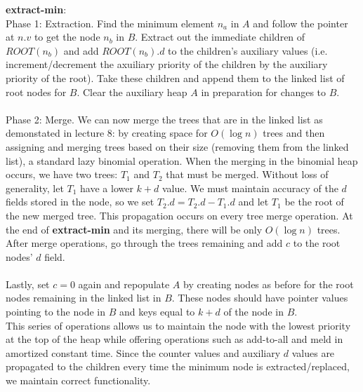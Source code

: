\documentclass{article}
\theoremstyle{casestyle}
\begin{document}
\textbf{extract-min}: \\ Phase 1: Extraction. Find the minimum element $n_a$ in $A$ and follow the pointer at $n.v$ to get the node $n_b$ in $B$. Extract out the immediate children of $ROOT(n_b)$ and add $ROOT(n_b).d$ to the children's auxiliary values (i.e. increment/decrement the axuiliary priority of the children by the auxiliary priority of the root). Take these children and append them to the linked list of root nodes for $B$. Clear the auxiliary heap $A$ in preparation for changes to $B$. \\\\ Phase 2: Merge. We can now merge the trees that are in the linked list as demonstated in lecture 8: by creating space for $O(\log n)$ trees and then assigning and merging trees based on their size (removing them from the linked list), a standard lazy binomial operation. When the merging in the binomial heap occurs, we have two trees: $T_1$ and $T_2$ that must be merged. Without loss of generality, let $T_1$ have a lower $k+d$ value. We must maintain accuracy of the $d$ fields stored in the node, so we set $T_2.d = T_2.d - T_1.d$ and let $T_1$ be the root of the new merged tree. This propagation occurs on every tree merge operation. At the end of \textbf{extract-min} and its merging, there will be only $O(\log n)$ trees. After merge operations, go through the trees remaining and add $c$ to the root nodes' $d$ field. \\\\ Lastly, set $c=0$ again and repopulate $A$ by creating nodes as before for the root nodes remaining in the linked list in $B$. These nodes should have pointer values pointing to the node in $B$ and keys equal to $k+d$ of the node in $B$.\\

This series of operations allows us to maintain the node with the lowest priority at the top of the heap while offering operations such as add-to-all and meld in amortized constant time. Since the counter values and auxiliary $d$ values are propagated to the children every time the minimum node is extracted/replaced, we maintain correct functionality.\\\\
\end{document}
